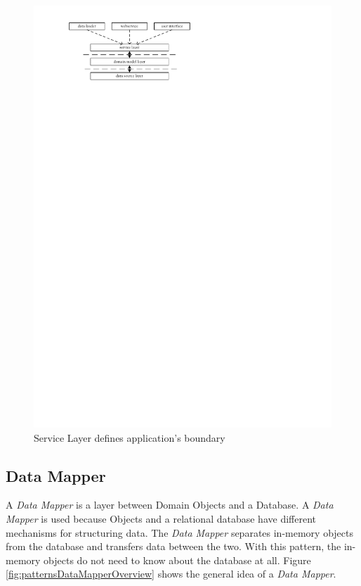 			\begin{figure}[htb]
				\begin{center}
					\includegraphics{./files/inc/figures/patternsServiceLayer}
					\caption{\label{fig:patternsServiceLayer} Service Layer defines application's boundary}
				\end{center}
			\end{figure}
	
		\subsection{Data Mapper}
		\label{subsec:dataMapper}
			A \textit{Data Mapper} is a layer between Domain Objects and a Database.
			A \textit{Data Mapper} is used because Objects and a relational database have
			different mechanisms for structuring data. The \textit{Data Mapper} separates in-memory objects 
			from the database and transfers data between the two. With this pattern,
			the in-memory objects do not need to know about the database at all. Figure
			\ref{fig:patternsDataMapperOverview} shows the general idea of a \textit{Data Mapper}.

